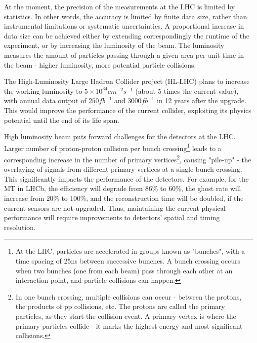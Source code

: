 At the moment, the precision of the measurements at the LHC is limited by statistics. In other words, the accuracy is limited by finite data size, rather than instrumental limitations or systematic uncertainties. A proportional increase in data size can be achieved either by extending correspondingly the runtime of the experiment, or by increasing the luminosity of the beam. The luminosity measures the amount of particles passing through a given area per unit time in the beam - higher luminosity, more potential particle collisions. 

The High-Luminosity Large Hadron Collider project (HL-LHC) plans to increase the working luminosity to $5 \times 10^{34} cm^{-2} s^{-1}$ (about 5 times the current value), with annual data output of $250 fb^{-1}$ and $3000 fb^{-1}$ in 12 years after the upgrade\cite{HLLHC}. This would improve the performance of the current collider, exploiting its physics potential until the end of its life span\cite{CERNbrochure}.

High luminosity beam puts forward challenges for the detectors at the LHC. Larger number of proton-proton collision per bunch crossing\footnote{At the LHC, particles are accelerated in groups known as "bunches", with a time spacing of 25ns between successive bunches\cite{HLLHC}. A bunch crossing occurs when two bunches (one from each beam) pass through each other at an interaction point, and particle collisions can happen.} leads to a corresponding increase in the number of primary vertices\footnote{In one bunch crossing, multiple collisions can occur - between the protons, the products of pp collisions, etc. The protons are called the primary particles, as they start the collision event. A primary vertex is where the primary particles collide - it marks the highest-energy and most significant collisions. }, causing "pile-up" - the overlaying of signals from different primary vertices at a single bunch crossing. This significantly impacts the performance of the detectors. For example, for the MT in LHCb, the efficiency will degrade from $86\%$ to $60\%$, the ghost rate will increase from $20\%$ to $100\%$, and the reconstruction time will be doubled\cite{TDR}, if the current sensors are not upgraded. Thus, maintaining the current physical performance will require improvements to detectors' spatial and timing resolution.

